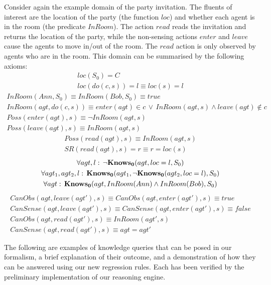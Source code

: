 Consider again the example domain of the party invitation. The fluents
of interest are the location of the party (the function $loc$) and
whether each agent is in the room (the predicate $InRoom$). The action
$read$ reads the invitation and returns the location of the party,
while the non-sensing actions $enter$ and $leave$ cause the agents
to move in/out of the room. The $read$ action is only observed by
agents who are in the room. This domain can be summarised by the following
axioms:\begin{gather*}
loc(S_{0})=C\\
loc(do(c,s))=l\equiv loc(s)=l\end{gather*}
\begin{gather*}
InRoom(Ann,S_{0})\equiv InRoom(Bob,S_{0})\equiv true\\
InRoom(agt,do(c,s))\equiv enter(agt)\in c\,\vee\, InRoom(agt,s)\wedge leave(agt)\notin c\\
Poss(enter(agt),s)\equiv\neg InRoom(agt,s)\\
Poss(leave(agt),s)\equiv InRoom(agt,s)\end{gather*}
\begin{gather*}
Poss(read(agt),s)\equiv InRoom(agt,s)\\
SR(read(agt),s)=r\equiv r=loc(s)\end{gather*}
\begin{gather*}
\forall agt,l:\,\neg\mathbf{Knows_{0}}(agt,loc=l,S_{0})\\
\forall agt_{1},agt_{2},l:\,\mathbf{Knows_{0}}(agt_{1},\neg\mathbf{Knows_{0}}(agt_{2},loc=l),S_{0})\\
\forall agt:\,\mathbf{Knows_{0}}(agt,InRoom(Ann)\wedge InRoom(Bob),S_{0})\end{gather*}
\begin{gather*}
CanObs(agt,leave(agt'),s)\equiv CanObs(agt,enter(agt'),s)\equiv true\\
CanSense(agt,leave(agt'),s)\equiv CanSense(agt,enter(agt'),s)\equiv false\\
CanObs(agt,read(agt'),s)\equiv InRoom(agt',s)\\
CanSense(agt,read(agt'),s)\equiv agt=agt'\end{gather*}


\medskip{}


The following are examples of knowledge queries that can be posed
in our formalism, a brief explanation of their outcome, and a demonstration
of how they can be answered using our new regression rules. Each has
been verified by the preliminary implementation of our reasoning engine.\newpage{}

